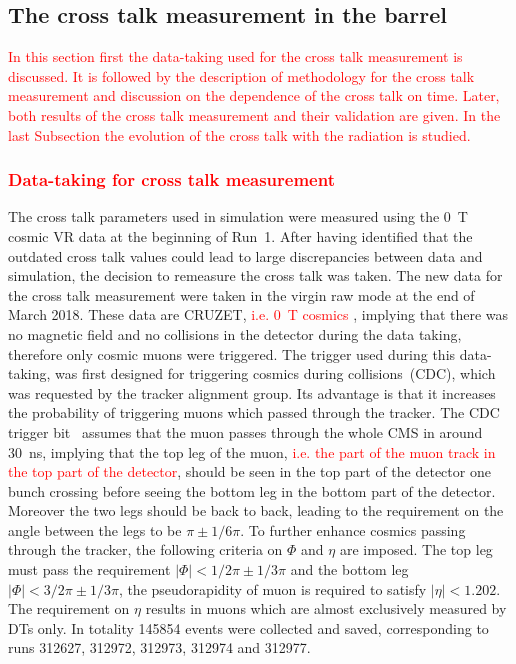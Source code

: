 \subsection{The cross talk  measurement in the barrel~\label{sec:xtalkb}}

\textcolor{red}{In this section first the data-taking used for the cross talk measurement is discussed. It is followed by the description of methodology for the cross talk measurement and discussion on the dependence of the cross talk on time. Later, both results of the cross talk measurement and their validation are given. In the last Subsection the evolution of the cross talk with the radiation is studied. } 


\subsubsection{\textcolor{red}{Data-taking for cross talk measurement}}

The cross talk parameters used in simulation were measured using the 0~T cosmic VR data at the beginning of Run~1. After having identified that the outdated cross talk values could lead to large discrepancies between data and simulation, the decision  to remeasure the cross talk was taken. The new data for the cross talk measurement were taken in the virgin raw mode at the end of March 2018. These data are CRUZET, \textcolor{red}{i.e. 0~T cosmics } , implying that there was no magnetic field and no collisions in the detector during the data taking, therefore only cosmic muons were triggered. The trigger used during this data-taking, was first designed for triggering cosmics during collisions~(CDC), which was requested by the tracker alignment group. Its advantage is that it increases the probability of triggering muons which passed through the tracker. The CDC trigger bit~\cite{website:trigger} assumes that the muon passes through the whole CMS in around 30~ns, implying that the top leg of the muon, \textcolor{red}{i.e. the part of the muon track in  the top part of the detector}, should be seen in the top part of the detector one bunch crossing before seeing the bottom leg in the bottom part of the detector. Moreover the two legs should be back to back, leading to the requirement on the angle between the legs to be $\pi \pm 1/6\pi$. To further enhance cosmics passing through the tracker, the following criteria on $\Phi$ and $\eta$ are imposed. The top leg must pass the requirement $|\Phi|<1/2\pi \pm 1/3\pi$ and the bottom leg $|\Phi|<3/2\pi \pm 1/3\pi$, the pseudorapidity of muon is required to satisfy $|\eta|<1.202$. The requirement on $\eta$ results in muons which are almost exclusively measured by DTs only. In totality 145854 events were collected and saved, corresponding to runs 312627, 312972, 312973, 312974 and 312977.

